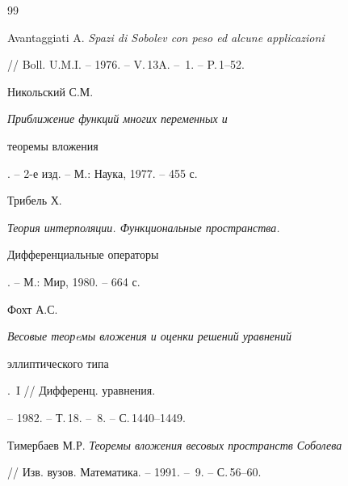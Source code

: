 \begin{thebibliography}{99}


Avantaggiati A. {\em Spazi di Sobolev con peso ed alcune applicazioni}


// Boll. U.M.I. -- 1976. -- V.\,13A. -- \No\,1. -- P.\,1--52.







Никольский С.М. {\em Приближение функций многих переменных и 


теоремы вложения}. -- 2-е изд. -- М.: Наука, 1977. -- 455 с.







Трибель Х. {\em Теория интерполяции. Функциональные пространства. 


Дифференциальные операторы}. -- М.: Мир, 1980. -- 664 с.







Фохт А.С. {\em Весовые теорeмы вложения и оценки решений уравнений 


эллиптического типа}.~I // Дифференц. уравнения.


-- 1982. -- Т.\,18. -- \No\,8. -- С.\,1440--1449. 







Тимербаев М.Р. {\em Теоремы вложения весовых пространств Соболева}


// Изв. вузов. Математика. -- 1991. -- \No\,9. -- С.\,56--60. 





\end{thebibliography}





\vskip 2cm












\label{end}






